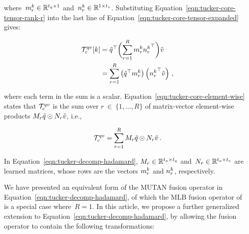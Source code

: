 \noindent where~$m_r^k \in \mathbb{R}^{t_q \times 1}$ and~$n_r^k \in \mathbb{R}^{1 \times t_v}$.
Substituting Equation~\ref{eqn:tucker-core-tensor-rank-r} into the last line of
Equation~\ref{eqn:tucker-core-tensor-expanded} gives:

\begin{align}
\begin{split}
        \mathcal{T}_c^{qv}[k] &= {\tilde{q}}^\top
                \biggl(\sum_{r = 1}^R m_r^k {n_r^k}^\top\biggr) \tilde{v}  \\
                     &= \sum_{r = 1}^R \left({\tilde{q}}^\top m_r^k\right)
                                \left({n_r^k}^\top \tilde{v}\right) \,,
\end{split}
\label{eqn:tucker-core-element-wise}
\end{align}

\noindent where each term in the sum is a scalar.
Equation~\ref{eqn:tucker-core-element-wise} states that $\mathcal{T}_c^{q{}v{}}$ is the sum
over $r~\in~\{1, \dots, R\}$ of matrix-vector element-wise products
$M_r \tilde{q} \odot N_r \tilde{v}$, i.e.,

\begin{equation}
        \mathcal{T}_c^{q{}v{}} =
                \sum_{r = 1}^R M_r \tilde{q} \odot N_r \tilde{v} \,.
\label{eqn:tucker-decomp-hadamard}
\end{equation}

\noindent In Equation~\ref{eqn:tucker-decomp-hadamard}, $M_r \in \mathbb{R}^{t_o \times t_q}$
and~$N_r \in \mathbb{R}^{t_o \times t_v}$ are learned matrices, whose rows are the
vectors $m_r^k$ and $n_r^k$, respectively.

We have presented an equivalent form of the MUTAN fusion operator in
Equation~\ref{eqn:tucker-decomp-hadamard}, of which the MLB fusion operator
of~\cite{Kim2017} is a special case where~$R = 1$. In this article, we propose a
further generalized extension to Equation~\ref{eqn:tucker-decomp-hadamard}, by
allowing the fusion operator to contain the following transformations:

